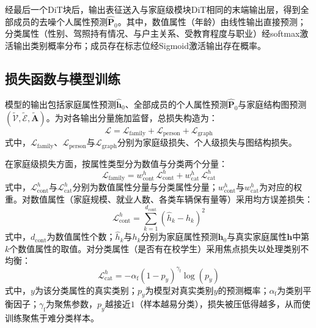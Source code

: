 经最后一个DiT块后，输出表征送入与家庭级模块DiT相同的末端输出层，得到全部成员的去噪个人属性预测$\hat{\mathbf{P}}_0$。其中，数值属性（年龄）由线性输出直接预测；分类属性（性别、驾照持有情况、与户主关系、受教育程度与职业）经softmax激活输出类别概率分布；成员存在标志位经Sigmoid激活输出存在概率。
 
\subsection{损失函数与模型训练}\label{subsec.popsyn.model.loss}
 
模型的输出包括家庭属性预测$\hat{\mathbf{h}}_0$、全部成员的个人属性预测$\hat{\mathbf{P}}_0$与家庭结构图预测$(\tilde{\mathcal{V}}, \tilde{\mathcal{E}}, \tilde{\mathbf{A}})$。为对各输出分量施加监督，总损失构造为：
\begin{equation}
  \mathcal{L} = \mathcal{L}_{\mathrm{family}} + \mathcal{L}_{\mathrm{person}} + \mathcal{L}_{\mathrm{graph}}
  \label{eq.popsyn.losstotal}
\end{equation}
式中，$\mathcal{L}_{\mathrm{family}}$、$\mathcal{L}_{\mathrm{person}}$与$\mathcal{L}_{\mathrm{graph}}$分别为家庭级损失、个人级损失与图结构损失。
 
在家庭级损失方面，按属性类型分为数值与分类两个分量：
\begin{equation}
  \mathcal{L}_{\mathrm{family}} = w_{\mathrm{cont}}^{h}\, \mathcal{L}_{\mathrm{cont}}^{h} + w_{\mathrm{cat}}^{h}\, \mathcal{L}_{\mathrm{cat}}^{h}
  \label{eq.popsyn.lossfam}
\end{equation}
式中，$\mathcal{L}_{\mathrm{cont}}^{h}$与$\mathcal{L}_{\mathrm{cat}}^{h}$分别为数值属性分量与分类属性分量；$w_{\mathrm{cont}}^{h}$与$w_{\mathrm{cat}}^{h}$为对应的权重。对数值属性（家庭规模、就业人数、各类车辆保有量等）采用均方误差损失：
\begin{equation}
  \mathcal{L}_{\mathrm{cont}}^{h} = \sum_{k=1}^{d_{\mathrm{cont}}} \left(\hat{h}_k - h_k\right)^2
  \label{eq.popsyn.lossmse}
\end{equation}
式中，$d_{\mathrm{cont}}$为数值属性个数；$\hat{h}_k$与$h_k$分别为家庭属性预测$\hat{\mathbf{h}}_0$与真实家庭属性$\mathbf{h}$中第$k$个数值属性的取值。对分类属性（是否有在校学生）采用焦点损失\cite{linFocalLossDense2017}以处理类别不均衡：
\begin{equation}
  \mathcal{L}_{\mathrm{cat}}^{h} = -\alpha_{\mathrm{f}} \left(1 - p_{y}\right)^{\gamma_{\mathrm{f}}} \log\left(p_{y}\right)
  \label{eq.popsyn.lossfocal}
\end{equation}
式中，$y$为该分类属性的真实类别；$p_{y}$为模型对真实类别$y$的预测概率；$\alpha_{\mathrm{f}}$为类别平衡因子；$\gamma_{\mathrm{f}}$为聚焦参数，$p_y$越接近$1$（样本越易分类），损失被压低得越多，从而使训练聚焦于难分类样本。
 

